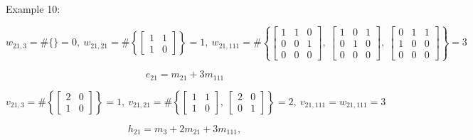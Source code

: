 \documentclass[12pt]{amsart}
\begin{document}
\begin{mdframed}[backgroundcolor=green!10]
	\label{exemple matrice} %
	\begin{it}Example 10: \end{it}

	 \begin{equation*}w_{21,3}=\#\{\}=0,~ w_{21,21}=\#\left\{\begin{bmatrix}1&1 \\ 1&0\end{bmatrix}\right\}=1,~w_{21,111}=\#\left\{\begin{bmatrix}1&1&0\\0&0&1\\0&0&0\end{bmatrix},~\begin{bmatrix}1&0&1\\0&1&0\\0&0&0\end{bmatrix},~\begin{bmatrix}0&1&1\\1&0&0\\0&0&0\end{bmatrix}\right\}=3
 	\end{equation*}
 
	\begin{equation*} e_{21}=m_{21}+3m_{111}
	\end{equation*}

	  \begin{equation*}v_{21,3}=\#\left\{\begin{bmatrix}2&0 \\ 1&0\end{bmatrix}\right\}=1,~v_{21,21}=\#\left\{\begin{bmatrix}1&1 \\ 			1&0\end{bmatrix},~\begin{bmatrix}2&0 \\ 0&1\end{bmatrix}\right\}=2,~v_{21,111}=w_{21,111}=3
	  \end{equation*}
  
	\begin{equation*} h_{21}=m_3+2m_{21}+3m_{111},
	\end{equation*}

	\hyperref[retour matrice]{}
\end{mdframed}
\end{document}
